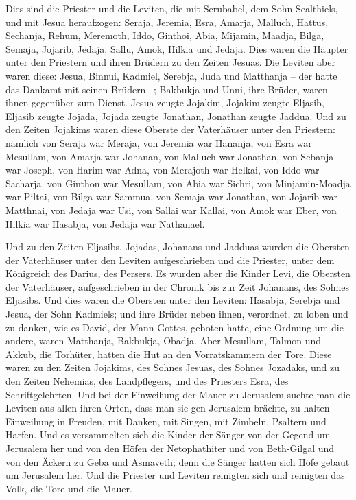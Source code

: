  Dies sind die Priester und die Leviten, die mit
Serubabel, dem Sohn Sealthiels, und mit Jesua heraufzogen: Seraja,
Jeremia, Esra,  Amarja, Malluch, Hattus, 
Sechanja, Rehum, Meremoth,  Iddo, Ginthoi, Abia,
 Mijamin, Maadja, Bilga,  Semaja, Jojarib,
Jedaja,  Sallu, Amok, Hilkia und Jedaja. Dies waren die
Häupter unter den Priestern und ihren Brüdern zu den Zeiten Jesuas.
 Die Leviten aber waren diese: Jesua, Binnui, Kadmiel,
Serebja, Juda und Matthanja -- der hatte das Dankamt mit seinen Brüdern
--;  Bakbukja und Unni, ihre Brüder, waren ihnen gegenüber
zum Dienst.  Jesua zeugte Jojakim, Jojakim zeugte
Eljasib, Eljasib zeugte Jojada,  Jojada zeugte Jonathan,
Jonathan zeugte Jaddua.  Und zu den Zeiten Jojakims waren
diese Oberste der Vaterhäuser unter den Priestern: nämlich von Seraja
war Meraja, von Jeremia war Hananja,  von Esra war
Mesullam, von Amarja war Johanan,  von Malluch war
Jonathan, von Sebanja war Joseph,  von Harim war Adna,
von Merajoth war Helkai,  von Iddo war Sacharja, von
Ginthon war Mesullam,  von Abia war Sichri, von
Minjamin-Moadja war Piltai,  von Bilga war Sammua, von
Semaja war Jonathan,  von Jojarib war Matthnai, von
Jedaja war Usi,  von Sallai war Kallai, von Amok war
Eber,  von Hilkia war Hasabja, von Jedaja war Nathanael.

 Und zu den Zeiten Eljasibs, Jojadas, Johanans und
Jadduas wurden die Obersten der Vaterhäuser unter den Leviten
aufgeschrieben und die Priester, unter dem Königreich des Darius, des
Persers.  Es wurden aber die Kinder Levi, die Obersten
der Vaterhäuser, aufgeschrieben in der Chronik bis zur Zeit Johanans,
des Sohnes Eljasibs.  Und dies waren die Obersten unter
den Leviten: Hasabja, Serebja und Jesua, der Sohn Kadmiels; und ihre
Brüder neben ihnen, verordnet, zu loben und zu danken, wie es David, der
Mann Gottes, geboten hatte, eine Ordnung um die andere, 
waren Matthanja, Bakbukja, Obadja. Aber Mesullam, Talmon und Akkub, die
Torhüter, hatten die Hut an den Vorratskammern der Tore. 
Diese waren zu den Zeiten Jojakims, des Sohnes Jesuas, des Sohnes
Jozadaks, und zu den Zeiten Nehemias, des Landpflegers, und des
Priesters Esra, des Schriftgelehrten.  Und bei der
Einweihung der Mauer zu Jerusalem suchte man die Leviten aus allen ihren
Orten, dass man sie gen Jerusalem brächte, zu halten Einweihung in
Freuden, mit Danken, mit Singen, mit Zimbeln, Psaltern und Harfen.
 Und es versammelten sich die Kinder der Sänger von der
Gegend um Jerusalem her und von den Höfen der Netophathiter
 und von Beth-Gilgal und von den Äckern zu Geba und
Asmaveth; denn die Sänger hatten sich Höfe gebaut um Jerusalem her.
 Und die Priester und Leviten reinigten sich und
reinigten das Volk, die Tore und die Mauer.

